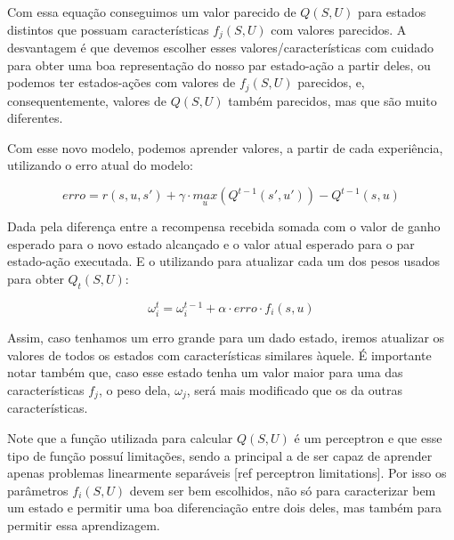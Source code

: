 Com essa equação conseguimos um valor parecido de $ Q \left( S, U \right) $ para estados distintos que possuam características $ f_j \left( S, U \right) $ com valores parecidos. A desvantagem é que devemos escolher esses valores/características com cuidado para obter uma boa representação do nosso par estado-ação a partir deles, ou podemos ter estados-ações com valores de $ f_j \left( S, U \right)$ parecidos, e, consequentemente, valores de $ Q \left( S, U \right) $ também parecidos, mas que são muito diferentes.

Com esse novo modelo, podemos aprender valores, a partir de cada experiência, utilizando o erro atual do modelo:

\begin{equation}
	erro = r \left( s, u, s' \right) + \gamma \cdot \underset{u}{max} \left( Q^{t-1} \left( s', u' \right) \right) - Q^{t-1} \left( s, u \right)
\end{equation}

Dada pela diferença entre a recompensa recebida somada com o valor de ganho esperado para o novo estado alcançado e o valor atual esperado para o par estado-ação executada. E o utilizando para atualizar cada um dos pesos usados para obter $ Q_t \left( S, U \right) $:

\begin{equation}
	\omega_i^t = \omega_i^{t-1} + \alpha \cdot erro \cdot f_i \left( s, u \right)
\end{equation}

Assim, caso tenhamos um erro grande para um dado estado, iremos atualizar os valores de todos os estados com características similares àquele. É importante notar também que, caso esse estado tenha um valor maior para uma das características $ f_j $, o peso dela, $ \omega_j $, será mais modificado que os da outras características.

Note que a função utilizada para calcular $ Q \left( S, U \right) $ é um perceptron e que esse tipo de função possuí limitações, sendo a principal a de ser capaz de aprender apenas problemas linearmente separáveis [ref perceptron limitations]. Por isso os parâmetros $ f_i \left( S, U \right) $ devem ser bem escolhidos, não só para caracterizar bem um estado e permitir uma boa diferenciação entre dois deles, mas também para permitir essa aprendizagem.



